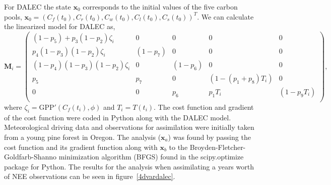 \documentclass[11pt]{article}
\begin{document}
For DALEC the state $\textbf{x}_0$ corresponds to the initial values of the five carbon pools,  $\textbf{x}_0 = (C_f(t_0), C_r(t_0), C_w(t_0), C_l(t_0), C_s(t_0))^T$. We can calculate the linearized model for DALEC as,
\begin{equation}
\mathbf{M}_{i}= 
\begin{pmatrix} 
(1-p_5)+p_3(1-p_2)\zeta_i & 0 & 0 & 0 & 0 \\
p_4(1-p_3)(1-p_2)\zeta_i & (1-p_7) & 0 & 0 & 0 \\
(1-p_4)(1-p_3)(1-p_2)\zeta_i & 0 & (1-p_6) & 0 & 0 \\
p_5 & p_7 & 0 & (1-(p_1+p_8)T_i) & 0 \\
0 & 0 & p_6 & p_1T_i & (1-p_9T_i) \\
\end{pmatrix}, \label{linmod}
\end{equation}
where $\zeta_i = \text{GPP}'(C_f(t_i), \phi)$ and $T_{i}=T(t_i)$. The cost function and gradient of the cost function were coded in Python along with the DALEC model. Meteorological driving data and observations for assimilation were initially taken from a young pine forest in Oregon. The analysis ($\textbf{x}_a$) was found by passing the cost function and its gradient function along with $\textbf{x}_b$ to the Broyden-Fletcher-Goldfarb-Shanno minimization algorithm (BFGS) \cite{Nocedal1999} found in the scipy.optimize package for Python.  The results for the analysis when assimilating a years worth of NEE observations can be seen in figure~\ref{4dvardalec}.
\end{document}
